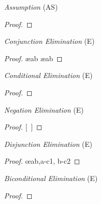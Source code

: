 \documentclass[a4paper, 11pt]{article} %
\begin{document}
\begin{multicols}{2}
  \vfill
  \strut
  \columnbreak

  \textit{Assumption} (AS)
  \begin{proof}
    \open
       \as{}{}
  \end{proof}
  \medskip

  \textit{Conjunction Elimination} (\eand E)
  \begin{proof}
     \ae{ab}
     \ae{ab}
  \end{proof}
  \medskip

  \textit{Conditional Elimination} (\eif E)
  \begin{proof}
     
  \end{proof}
  \medskip

  \textit{Negation Elimination} (\enot E)
  \begin{proof}
  \open
     
    \ellipsesline
    \metaB
  \close
  [\ ]\metaA{}
  \end{proof}
  \medskip

  \textit{Disjunction Elimination} (\eor E)
  \begin{proof}
    \open
       
    \close
    \open
       
    \close
     \oe{ab,a-c1, b-c2}
  \end{proof}
  \medskip

  \textit{Biconditional Elimination} (\eiff E)
  \begin{proof}
     
  \end{proof}
  \medskip

\end{multicols}
\end{document}
